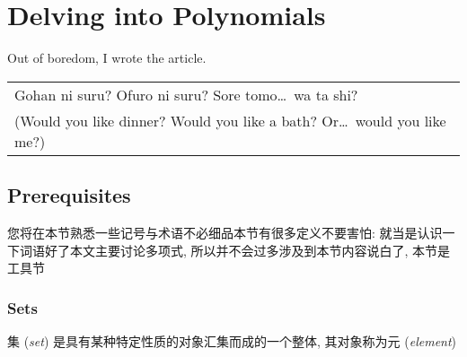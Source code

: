 
\def\CC{\mathbb{C}}
\def\RR{\mathbb{R}}
\def\QQ{\mathbb{Q}}
\def\ZZ{\mathbb{Z}}
\def\NN{\mathbb{N}}
\def\FF{\mathbb{F}}
\def\ii{\mathrm{i}}
\def\myStar{\ding{72}}
\def\ellipsis{\dots}
\def\period{\text{。}}
\def\qedsymbol{\ding{44}}
\newcommand{ \term}[1]{(\textit{#1})}

\section*{Delving into Polynomials}

Out of boredom, I wrote the article.

    {
        \vfill \itshape \sffamily \small
        \begin{center}
            \begin{tabular}{l}
                Gohan ni suru? Ofuro ni suru? Sore tomo\ellipsis \ wa ta shi? \\
                (Would you like dinner? Would you like a bath? Or\ellipsis \ would you like me?)
            \end{tabular}
        \end{center}
    }

\clearpage

\subsection*{Prerequisites}

您将在本节熟悉一些记号与术语\period 不必细品\period 本节有很多定义\period 不要害怕: 就当是认识一下词语好了\period 本文主要讨论多项式, 所以并不会过多涉及到本节内容\period 说白了, 本节是工具节\period

\subsubsection*{Sets}

\begin{definition}
    集 \term{set} 是具有某种特定性质的对象汇集而成的一个整体, 其对象称为元 \term{element}\period
\end{definition}

